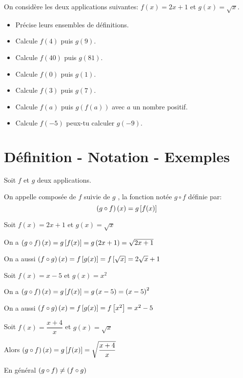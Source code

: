 


  
   \begin{lemma}
    On considère les deux applications suivantes: $ f(x)=2x+1 $  et  $ g(x)=\sqrt{x} $.
  \begin{itemize}
\item  Précise leurs ensembles de définitions.
 \item Calcule $ f(4) $  puis $ g(9) $.
 \item Calcule $ f(40) $  puis $ g(81) $.
 \item Calcule $ f(0) $  puis $ g(1) $.
 \item Calcule $ f(3) $  puis $ g(7) $.
 \item Calcule $ f(a) $  puis $ g(f(a)) $  avec $ a $ un nombre positif.
 \item Calcule $ f(-5) $  peux-tu calculer $ g(-9)$.
 \end{itemize}
 \end{lemma}
\section{Définition - Notation - Exemples}

  \begin{definition}
  Soit $f $ et $g$  deux applications.
 
 On appelle composée de $ f $ suivie de $ g $ , la fonction notée $ g\circ f $ définie par:
  \[\left(g\circ f\right)(x)=g\left[ f(x) \right]\]
 \end{definition}
  \begin{example}
  Soit $ f(x)= 2x+1 $  et $ g(x)=\sqrt{x} $

 
 On a $ \left(g\circ f\right)(x)=g\left[ f(x) \right]= g\left(2x+1\right)=\sqrt{2x+1} $
 


  On a aussi $ \left(f\circ g\right)(x)=f\left[ g(x) \right]= f\left[ \sqrt{x} \right]=2\sqrt{x}+1 $
  \end{example}

  \begin{example}
 
 Soit $ f(x)= x-5 $  et $ g(x)=x^{2} $
 
 
 On a $ \left(g\circ f\right)(x)=g\left[ f(x) \right]= g\left(x-5\right)=\left(x-5\right)^{2} $
 


  On a aussi $ \left(f\circ g\right)(x)=f\left[ g(x) \right]= f\left[ x^{2} \right]=x^{2}-5 $
 \end{example}

 
 \begin{example}
 
 Soit $ f(x)= \dfrac{x+4}{x} $  et $ g(x)=\sqrt{x} $

Alors \;  $ \left(g\circ f\right)(x)=g\left[ f(x) \right]= \sqrt{\dfrac{x+4}{x}} $
  \end{example}
 
 \begin{remark}
  En général $ \left(g\circ f\right) \neq  \left(f\circ g\right)$
 \end{remark}
 

